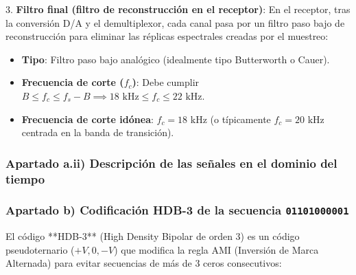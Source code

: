\begin{resolucion}
{\begin{resolucion}
3. \textbf{Filtro final (filtro de reconstrucción en el receptor)}:
   En el receptor, tras la conversión D/A y el demultiplexor, cada canal pasa por un filtro paso bajo de reconstrucción para eliminar las réplicas espectrales creadas por el muestreo:
   \begin{itemize}
       \item \textbf{Tipo}: Filtro paso bajo analógico (idealmente tipo Butterworth o Cauer).
       \item \textbf{Frecuencia de corte ($f_c$)}: Debe cumplir $B \le f_c \le f_s - B \implies 18\text{ kHz} \le f_c \le 22\text{ kHz}$.
       \item \textbf{Frecuencia de corte idónea}: $f_c = 18\text{ kHz}$ (o típicamente $f_c = 20\text{ kHz}$ centrada en la banda de transición).
   \end{itemize}

\subsubsection*{Apartado a.ii) Descripción de las señales en el dominio del tiempo}


\subsubsection*{Apartado b) Codificación HDB-3 de la secuencia \texttt{01101000001}}

El código **HDB-3** (High Density Bipolar de orden 3) es un código pseudoternario ($+V, 0, -V$) que modifica la regla AMI (Inversión de Marca Alternada) para evitar secuencias de más de 3 ceros consecutivos:


\end{resolucion}}
\end{resolucion}
